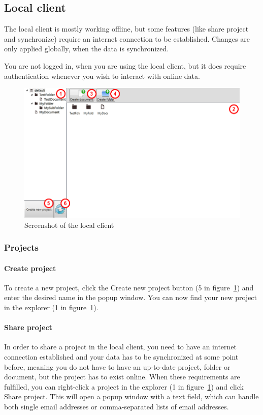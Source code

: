 \subsection{Local client}

The local client is mostly working offline, but some features (like share project and synchronize) require an
internet connection to be established. Changes are only applied globally, when the data is synchronized.

You are not logged in, when you are using the local client, but it does require authentication whenever you wish to interact with online data.

\begin{figure}[htb]
	\centering
	\includegraphics[width=1\textwidth]{User_manual/graphics/local.png}
	\caption{Screenshot of the local client}
	\label{fig:manual-local}
\end{figure}

\subsubsection{Projects}

	\paragraph{Create project}
	To create a new project, click the Create new project button (5 in figure~\ref{fig:manual-local}) and enter the desired name in the popup window. You can now find your new project in the explorer (1 in figure~\ref{fig:manual-local}).

	\paragraph{Share project}
	In order to share a project in the local client, you need to have an internet connection established and your data
    has to be synchronized at some point before, meaning you do not have to have an up-to-date project, folder or
    document, but the project has to exist online. When these requirements are fulfilled, you can right-click a project
    in the explorer (1 in figure~\ref{fig:manual-local}) and click Share project. This will open a popup window with
    a text field, which can handle both single email addresses or comma-separated lists of email addresses.

